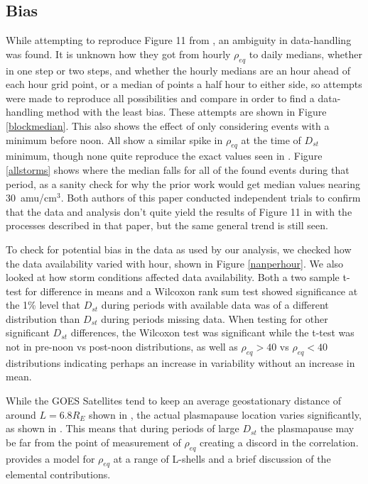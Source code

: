 \documentclass[10pt,twocolumn]{article}
\begin{document}
\subsection{Bias}
While attempting to reproduce Figure 11 from \cite{Takahashi2010}, an ambiguity in data-handling was found. It is unknown how they got from hourly $\rho_{eq}$ to daily medians, whether in one step or two steps, and whether the hourly medians are an hour ahead of each hour grid point, or a median of points a half hour to either side, so attempts were made to reproduce all possibilities and compare in order to find a data-handling method with the least bias. These attempts are shown in Figure \ref{blockmedian}. This also shows the effect of only considering events with a minimum before noon. All show a similar spike in $\rho_{eq}$ at the time of $D_{st}$ minimum, though none quite reproduce the exact values seen in \cite{Takahashi2010}. Figure \ref{allstorms} shows where the median falls for all of the found events during that period, as a sanity check for why the prior work would get median values nearing $30$~amu/cm$^3$. Both authors of this paper conducted independent trials to confirm that the data and analysis don't quite yield the results of Figure 11 in \cite{Takahashi2010} with the processes described in that paper, but the same general trend is still seen. 

To check for potential bias in the data as used by our analysis, we checked how the data availability varied with hour, shown in Figure \ref{nanperhour}. We also looked at how storm conditions affected data availability. Both a two sample t-test for difference in means and a Wilcoxon rank sum test showed significance at the 1\% level that $D_{st}$ during periods with available data was of a different distribution than $D_{st}$ during periods missing data. When testing for other significant $D_{st}$ differences, the Wilcoxon test was significant while the t-test was not in pre-noon vs post-noon distributions, as well as $\rho_{eq}>40$ vs $\rho_{eq}<40$ distributions indicating perhaps an increase in variability without an increase in mean.

While the GOES Satellites tend to keep an average geostationary distance of around $L=6.8R_E$ shown in \cite{Takahashi2010}, the actual plasmapause location varies significantly, as shown in \cite{OBrien2003}. This means that during periods of large $D_{st}$ the plasmapause may be far from the point of measurement of $\rho_{eq}$ creating a discord in the correlation. \cite{Gallagher2000} provides a model for $\rho_{eq}$ at a range of L-shells and a brief discussion of the elemental contributions.
\end{document}

